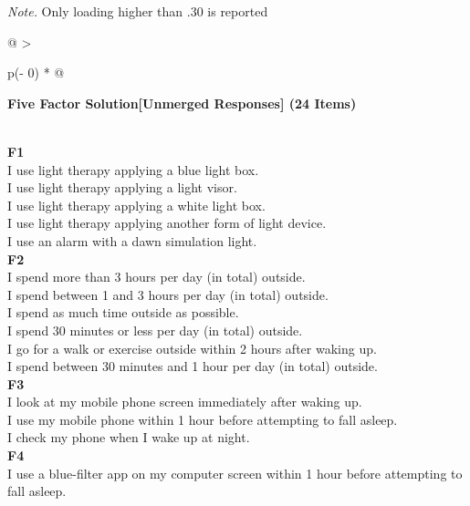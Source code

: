 \begin{appendix}
\begin{table}[h]
\begin{center}
\begin{threeparttable}
{}

\begin{tablenotes}[para]
\normalsize{\textit{Note.} Only loading higher than .30 is reported}
\end{tablenotes}

\end{threeparttable}
\end{center}

\end{table}

\begin{longtable}[]{@{}
  >{\raggedright\arraybackslash}p{(\columnwidth - 0\tabcolsep) * }@{}}
\toprule
\begin{minipage}[b]{\linewidth}\raggedright
\textbf{Five Factor Solution{[}Unmerged Responses{]} (24 Items)}
\end{minipage} \\
\midrule
\endhead
\textbf{F1} \\
I use light therapy applying a blue light box. \\
I use light therapy applying a light visor. \\
I use light therapy applying a white light box. \\
I use light therapy applying another form of light device. \\
I use an alarm with a dawn simulation light. \\
\textbf{F2} \\
I spend more than 3 hours per day (in total) outside. \\
I spend between 1 and 3 hours per day (in total) outside. \\
I spend as much time outside as possible. \\
I spend 30 minutes or less per day (in total) outside. \\
I go for a walk or exercise outside within 2 hours after waking up. \\
I spend between 30 minutes and 1 hour per day (in total) outside. \\
\textbf{F3} \\
I look at my mobile phone screen immediately after waking up. \\
I use my mobile phone within 1 hour before attempting to fall asleep. \\
I check my phone when I wake up at night. \\
\textbf{F4} \\
I use a blue-filter app on my computer screen within 1 hour before
attempting to fall asleep. \\

\end{longtable}
\end{appendix}
